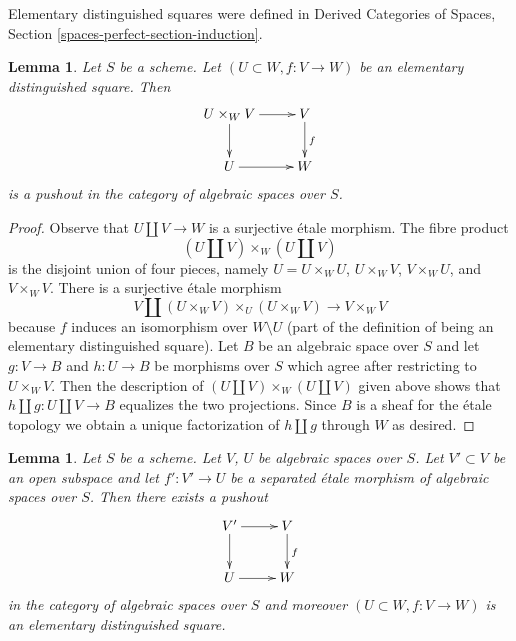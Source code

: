 \documentclass{stacks-project}
\theoremstyle{plain}
\newtheorem{lemma}[subsection]{Lemma}
\theoremstyle{definition}
\theoremstyle{remark}
\numberwithin{equation}{subsection}
\begin{document}
\noindent
Elementary distinguished squares were defined in
Derived Categories of Spaces, Section \ref{spaces-perfect-section-induction}.

\begin{lemma}
\label{lemma-elementary-distinguished-square-pushout}
Let $S$ be a scheme. Let $(U \subset W, f : V \to W)$ be
an elementary distinguished square. Then
$$
\xymatrix{
U \times_W V \ar[r] \ar[d] &
V \ar[d]^f \\
U \ar[r] & W
}
$$
is a pushout in the category of algebraic spaces over $S$.
\end{lemma}

\begin{proof}
Observe that $U \amalg V \to W$ is a surjective \'etale morphism.
The fibre product
$$
(U \amalg V) \times_W (U \amalg V)
$$
is the disjoint union of four pieces, namely
$U = U \times_W U$, $U \times_W V$, $V \times_W U$,
and $V \times_W V$.
There is a surjective \'etale morphism
$$
V \amalg (U \times_W V) \times_U (U \times_W V) \longrightarrow V \times_W V
$$
because $f$ induces an isomorphism over $W \setminus U$
(part of the definition of being an elementary distinguished square).
Let $B$ be an algebraic space over $S$ and let
$g : V \to B$ and $h : U \to B$ be morphisms over
$S$ which agree after restricting to $U \times_W V$.
Then the description of
$(U \amalg V) \times_W (U \amalg V)$ given above
shows that $h \amalg g : U \amalg V \to B$
equalizes the two projections. Since $B$ is a sheaf
for the \'etale topology we obtain a unique
factorization of $h \amalg g$ through $W$ as desired.
\end{proof}

\begin{lemma}
\label{lemma-construct-elementary-distinguished-square}
Let $S$ be a scheme. Let $V$, $U$ be algebraic spaces over $S$.
Let $V' \subset V$ be an open subspace and let $f' : V' \to U$ be a
separated \'etale morphism of algebraic spaces over $S$.
Then there exists a pushout
$$
\xymatrix{
V' \ar[r] \ar[d] &
V \ar[d]^f \\
U \ar[r] & W
}
$$
in the category of algebraic spaces over $S$ and moreover
$(U \subset W, f : V \to W)$ is an elementary distinguished square.
\end{lemma}
\end{document}
